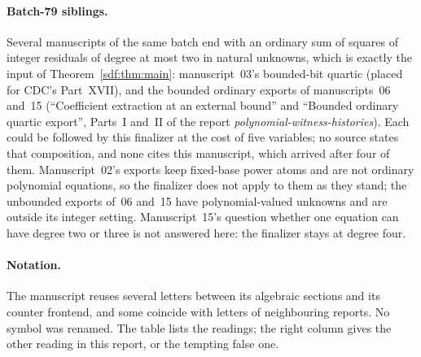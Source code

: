 \documentclass[11pt,a4paper]{article}
\theoremstyle{definition}
\theoremstyle{remark}
\begin{document}
\paragraph{Batch-79 siblings.} Several manuscripts of the same batch end with
an ordinary sum of squares of integer residuals of degree at most two in
natural unknowns, which is exactly the input of Theorem~\ref{sdf:thm:main}:
manuscript~03's bounded-bit quartic (placed for CDC's Part~XVII), and the
bounded ordinary exports of manuscripts~06 and~15 (``Coefficient extraction
at an external bound'' and ``Bounded ordinary quartic export'', Parts~I
and~II of the report \emph{polynomial-witness-histories}). Each could be
followed by this finalizer at the cost of five variables; no source states
that composition, and none cites this manuscript, which arrived after four of
them. Manuscript~02's exports keep fixed-base power atoms and are not
ordinary polynomial equations, so the finalizer does not apply to them as
they stand; the unbounded exports of~06 and~15 have polynomial-valued unknowns
and are outside its integer setting. Manuscript~15's question whether one
equation can have degree two or three is not answered here: the finalizer
stays at degree four.

\paragraph{Notation.} The manuscript reuses several letters between its
algebraic sections and its counter frontend, and some coincide with letters
of neighbouring reports. No symbol was renamed. The table lists the readings;
the right column gives the other reading in this report, or the
tempting false one.
\end{document}
